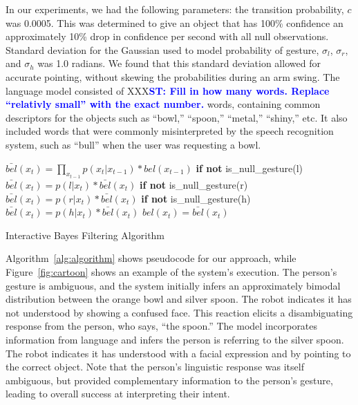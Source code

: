 \documentclass[letterpaper, 10 pt, conference]{ieeeconf}
\newcommand{\stnote}[1]{\textcolor{Blue}{\textbf{ST: #1}}}
\begin{document}
In our experiments, we had the following parameters: the transition
probability, $c$ was 0.0005. This was determined to give an object
that has 100\% confidence an approximately 10\% drop in confidence per
second with all null observations.  Standard deviation for the
Gaussian used to model probability of gesture, $\sigma_l$,
$\sigma_r$, and $\sigma_h$ was 1.0 radians. We found that this
standard deviation allowed for accurate pointing, without skewing the
probabilities during an arm swing.  The language model consisted of
XXX\stnote{Fill in how many words. Replace ``relativly small'' with
  the exact number.} words, containing common descriptors for the
objects such as ``bowl,'' ``spoon,'' ``metal,'' ``shiny,'' etc. It
also included words that were commonly misinterpreted by the speech
recognition system, such as ``bull'' when the user was requesting a
bowl.  


\begin{algorithm}
    \DontPrintSemicolon
    \BlankLine
    \BlankLine
     {
      $\bar{bel}(x_t) = \displaystyle\prod_{x_{t-1}} p(x_t|x_{t-1})*bel(x_{t-1})$
      \BlankLine
      \textbf{if not} is\_null\_gesture(l)
      \BlankLine
      \Indp$\bar{bel}(x_t) = p(l | x_t) *  \bar{bel}(x_t)$
      \BlankLine
      \Indm\textbf{if not} is\_null\_gesture(r)
      \BlankLine
      \Indp$\bar{bel}(x_t) = p(r | x_t) *  \bar{bel}(x_t)$
      \BlankLine
      \Indm\textbf{if not} is\_null\_gesture(h)
      \BlankLine
      \Indp$\bar{bel}(x_t) = p(h | x_t) *  \bar{bel}(x_t)$
      \BlankLine
      \Indm{}
      $bel(x_t) = \bar{bel}(x_t)$

    }
    \BlankLine
\caption{Interactive Bayes Filtering Algorithm} 
\label{alg:algorithm}
\end{algorithm}

Algorithm~\ref{alg:algorithm} shows pseudocode for our approach, while
Figure~\ref{fig:cartoon} shows an example of the system's execution.
The person's gesture is ambiguous, and the system initially infers an
approximately bimodal distribution between the orange bowl and silver
spoon.  The robot indicates it has not understood by showing a
confused face.  This reaction elicits a disambiguating response from
the person, who says, ``the spoon.''  The model incorporates
information from language and infers the person is referring to the
silver spoon.  The robot indicates it has understood with a facial
expression and by pointing to the correct object.  Note that the
person's linguistic response was itself ambiguous, but provided
complementary information to the person's gesture, leading to overall
success at interpreting their intent.
\end{document}
